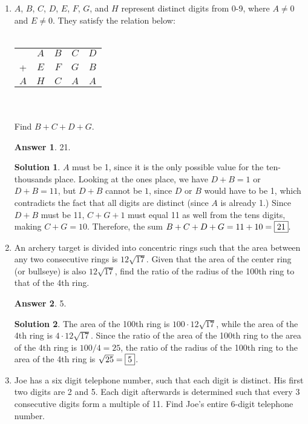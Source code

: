 \documentclass[11pt]{article}
\theoremstyle{definition}
\newtheorem*{solution}{Solution}
\newtheorem*{answer}{Answer}
\begin{document}
\begin{enumerate}
\item %
$A$, $B$, $C$, $D$, $E$, $F$, $G$, and $H$ represent distinct digits from 0-9, where $A \neq 0$ and $E \neq 0$. They satisfy the relation below:\\
\\
\begin{tabular}{c c c c c}
    & $A$ & $B$ & $C$ & $D$ \\
  + & $E$ & $F$ & $G$ & $B$ \\
  \hline
  $A$ & $H$ & $C$ & $A$ & $A$\\
\end{tabular}
\\
\\
Find $B+C+D+G$.

\begin{answer}
21.
\end{answer}
\begin{solution}
 $A$ must be 1, since it is the only possible value for the ten-thousands place. Looking at the ones place, we have $D+B = 1$ or $D+B = 11$, but $D+B$ cannot be $1$, since $D$ or $B$ would have to be 1, which contradicts the fact that all digits are distinct (since $A$ is already 1.) Since $D+B$ must be 11, $C+G+1$ must equal 11 as well from the tens digits, making $C+G = 10$. Therefore, the sum $B+C+D+G = 11+10 = \framebox{21}.$
\end{solution}

\item %
An archery target is divided into concentric rings such that the area between any two consecutive rings is $12\sqrt{17}$. Given that the area of the center ring (or bullseye) is also $12\sqrt{17}$, find the ratio of the radius of the 100th ring to that of the 4th ring.

\begin{answer}
5.
\end{answer}
\begin{solution}
 The area of the 100th ring is $100 \cdot 12\sqrt{17}$, while the area of the 4th ring is $4 \cdot 12\sqrt{17}$. Since the ratio of the area of the 100th ring to the area of the 4th ring is $100/4 = 25$, the ratio of the radius of the 100th ring to the area of the 4th ring is $\sqrt{25} = \framebox{5}$.
\end{solution}

\item %
Joe has a six digit telephone number, such that each digit is distinct. His first two digits are 2 and 5. Each digit afterwards is determined such that every 3 consecutive digits form a multiple of 11. Find Joe's entire 6-digit telephone number.


\end{enumerate}
\end{document}
